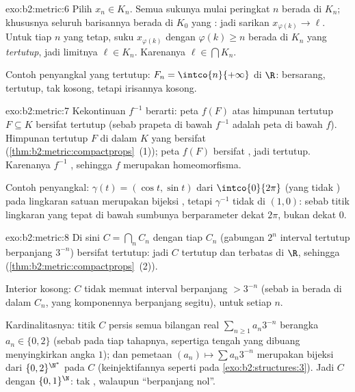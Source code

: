 \begin{solution}{exo:b2:metric:6}
Pilih $x_n \in K_n$. Semua sukunya mulai peringkat $n$ berada di $K_n$;
khususnya seluruh barisannya berada di $K_0$ yang : jadi sarikan
$x_{\varphi(k)} \to \ell$. Untuk tiap $n$ yang tetap, suku
$x_{\varphi(k)}$ dengan $\varphi(k) \geq n$ berada di $K_n$ yang
\emph{tertutup}, jadi limitnya $\ell \in K_n$. Karenanya $\ell \in
\bigcap K_n$.

Contoh penyangkal yang tertutup: $F_n = \intco{n}{+\infty}$ di $\R$:
bersarang, tertutup, tak kosong, tetapi irisannya kosong.
\end{solution}

\begin{solution}{exo:b2:metric:7}
Kekontinuan $f^{-1}$ berarti: peta $f(F)$ atas himpunan tertutup $F
\subseteq K$ bersifat tertutup (sebab prapeta di bawah $f^{-1}$ adalah
peta di bawah $f$). Himpunan tertutup $F$ di dalam $K$ yang 
bersifat  (\cref{thm:b2:metric:compactprops}~(1)); peta 
$f(F)$ bersifat , jadi tertutup. Karenanya $f^{-1}$ ,
sehingga $f$ merupakan homeomorfisma.

Contoh penyangkal: $\gamma(t) = (\cos t, \sin t)$ dari
$\intco{0}{2\pi}$ (yang tidak ) pada lingkaran satuan merupakan
bijeksi , tetapi $\gamma^{-1}$ tidak  di $(1,0)$:
sebab titik lingkaran yang tepat di bawah sumbunya berparameter dekat
$2\pi$, bukan dekat $0$.
\end{solution}

\begin{solution}{exo:b2:metric:8}
Di sini $C = \bigcap_n C_n$ dengan tiap $C_n$ (gabungan $2^n$ interval
tertutup berpanjang $3^{-n}$) bersifat tertutup: jadi $C$ tertutup dan
terbatas di $\R$, sehingga  (\cref{thm:b2:metric:compactprops}~(2)).

Interior kosong: $C$ tidak memuat interval berpanjang $> 3^{-n}$ (sebab
ia berada di dalam $C_n$, yang komponennya berpanjang segitu), untuk
setiap $n$.

Kardinalitasnya: titik $C$ persis semua bilangan real $\sum_{n\geq1}
a_n 3^{-n}$ berangka $a_n \in \{0, 2\}$ (sebab pada tiap tahapnya,
sepertiga tengah yang dibuang menyingkirkan angka $1$); dan pemetaan
$(a_n) \mapsto \sum a_n 3^{-n}$ merupakan bijeksi dari $\{0,2\}^{\N^*}$
pada $C$ (keinjektifannya seperti pada \cref{exo:b2:structures:3}). Jadi
$C$  dengan $\{0,1\}^{\N}$: tak , walaupun ``berpanjang nol''.
\end{solution}

